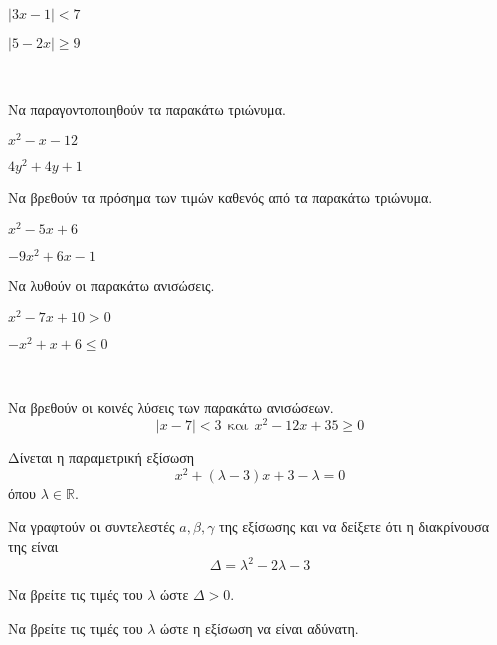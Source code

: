 \documentclass[twoside,nofonts,ektypwsh,math,spyros]{frontisthrio-diag}
\begin{document}
\begin{thema}
\begin{erwthma}
\begin{multicols}{2}
\begin{alist}
\item $ |3x-1|<7 $
\item $ |5-2x|\geq 9 $
\end{alist}
\end{multicols}
\end{erwthma}
\item\mbox{}\\\vspace{-7mm}
\begin{erwthma}
\item Να παραγοντοποιηθούν τα παρακάτω τριώνυμα.
\begin{multicols}{2}
\begin{alist}
\item $ x^2-x-12 $
\item $ 4y^2+4y+1 $
\end{alist}
\end{multicols}
\item Να βρεθούν τα πρόσημα των τιμών καθενός από τα παρακάτω τριώνυμα.
\begin{multicols}{2}
\begin{alist}
\item $ x^2-5x+6 $
\item $ -9x^2+6x-1 $
\end{alist}
\end{multicols}
\item Να λυθούν οι παρακάτω ανισώσεις.
\begin{multicols}{2}
\begin{alist}
\item $ x^2-7x+10>0 $
\item $ -x^2+x+6\leq 0 $
\end{alist}
\end{multicols}
\end{erwthma}
\item\mbox{}\\\vspace{-7mm}
\begin{erwthma}
\item Να βρεθούν οι κοινές λύσεις των παρακάτω ανισώσεων.
\[ |x-7|<3\ \ \textrm{και}\ \ x^2-12x+35\geq 0 \]
\item Δίνεται η παραμετρική εξίσωση
\[ x^2+(\lambda-3)x+3-\lambda=0 \]
όπου $ \lambda\in\mathbb{R} $.
\begin{alist}
\item Να γραφτούν οι συντελεστές $ a,\beta,\gamma $ της εξίσωσης και να δείξετε ότι η διακρίνουσα της είναι \[ \Delta=\lambda^2-2\lambda-3 \]
\item Να βρείτε τις τιμές του $ \lambda $ ώστε $ \Delta>0 $.
\item Να βρείτε τις τιμές του $ \lambda $ ώστε η εξίσωση να είναι αδύνατη. 
\end{alist}
\end{erwthma}
\end{thema}
\kaliepityxia
\end{document}

